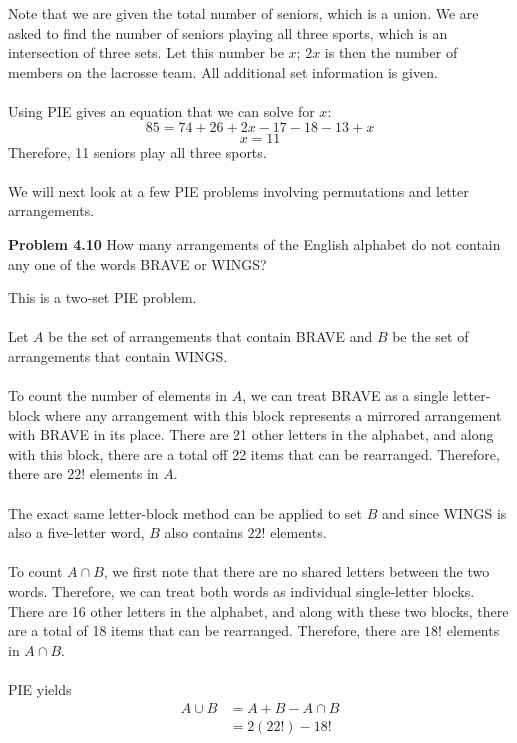 \documentclass[11pt]{scrartcl}
\begin{document}
\noindent 
Note that we are given the total number of seniors, which is a union. We are asked to find the number of seniors playing all three sports, which is an intersection of three sets. Let this number be $x$; $2x$ is then the number of members on the lacrosse team. All additional set information is given. \\
\\
\noindent 
Using PIE gives an equation that we can solve for $x$: 
$$85=74+26+2x-17-18-13+x$$
$$x=11$$ 
\noindent 
Therefore, 11 seniors play all three sports. \\
\\
\noindent 
We will next look at a few PIE problems involving permutations and letter arrangements. 
\\
\begin{tcolorbox}
\textbf{Problem 4.10} How many arrangements of the English alphabet do not contain any one of the words BRAVE or WINGS?
\end{tcolorbox}
\noindent 
This is a two-set PIE problem. \\
\\
\noindent 
Let $A$ be the set of arrangements that contain BRAVE and $B$ be the set of arrangements that contain WINGS. \\
\\
\noindent 
To count the number of elements in $A$, we can treat BRAVE as a single letter-block where any arrangement with this block represents a mirrored arrangement with BRAVE in its place. There are 21 other letters in the alphabet, and along with this block, there are a total off 22 items that can be rearranged. Therefore, there are $22!$ elements in $A$. \\
\\
\noindent 
The exact same letter-block method can be applied to set $B$ and since WINGS is also a five-letter word, $B$ also contains $22!$ elements. \\
\\
\noindent 
To count $A \cap B$, we first note that there are no shared letters between the two words. Therefore, we can treat both words as individual single-letter blocks. There are 16 other letters in the alphabet, and along with these two blocks, there are a total of 18 items that can be rearranged. Therefore, there are $18!$ elements in $A \cap B$. \\
\\
\noindent 
PIE yields 
\begin{align*}
    {A \cup B} &={A}+{B}-{A \cap B} \\
               &= 2(22!)-18! 
\end{align*}
\end{document}
